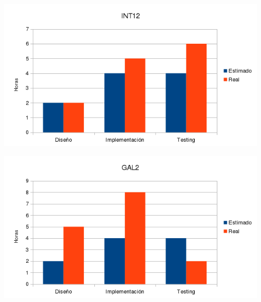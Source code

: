     \includegraphics[width=1\textwidth]{img/Hint12.png}

    \includegraphics[width=1\textwidth]{img/Hgal2.png}

